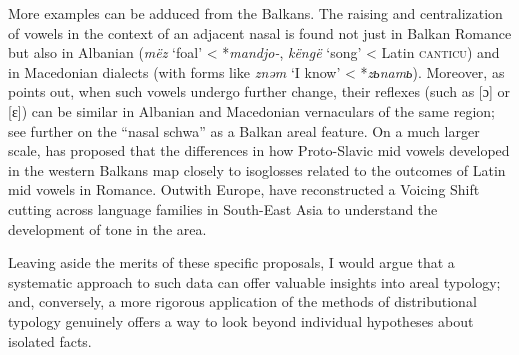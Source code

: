 \documentclass[output=paper,colorlinks,citecolor=brown]{langscibook}
\begin{document}
More examples can be adduced from the Balkans. The raising and centralization of vowels in the context of an adjacent nasal is found not just in Balkan Romance but also in Albanian  (\emph{mëz} `foal' < *\emph{mandjo-}, \emph{këngë} `song' < Latin \textsc{canticu}) and in Macedonian dialects (with forms like \emph{znəm} `I know' < *\emph{zьnamь}). Moreover, as \textcite[37]{koneski1983macedonian} points out, when such vowels undergo further change, their reflexes (such as [ɔ] or [ɛ]) can be similar in Albanian and Macedonian vernaculars of the same region; see further \textcite{sawicka2000} on the \enquote{nasal schwa} as a Balkan areal feature. On a much larger scale, \textcite{vermeer1989traces} has proposed that the differences in how Proto-Slavic mid vowels developed in the western Balkans map closely to isoglosses related to the outcomes of Latin mid vowels in Romance.  Outwith Europe, \textcite{dockum2021east} have reconstructed a Voicing Shift cutting across language families in South-East Asia to understand the development of tone in the area.

Leaving aside the merits of these specific proposals, I would argue that a systematic approach to such data can offer valuable insights into areal typology; and, conversely, a more rigorous application of the methods of distributional typology genuinely offers a way to look beyond individual hypotheses about isolated facts.
\end{document}
